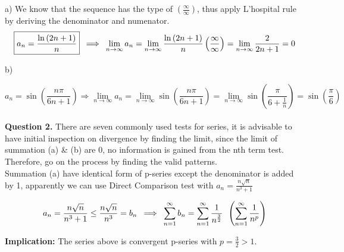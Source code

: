 \documentclass[a4paper]{exam}
\begin{document}
	\noindent a) We know that the sequence has the type of $\left(\frac{\infty}{\infty}\right)$, thus apply L'hospital rule by deriving the denominator and numenator. \\
	
	\begin{equation*}
		\boxed{a_{n} = \frac{\ln{\left(2n + 1\right)}}{n}} \hspace{0.5em} \Longrightarrow \hspace{0.5em} \lim_{n \to \infty} a_{n} = \lim_{n \to \infty} \frac{\ln{\left(2n + 1\right)}}{n} \left(\frac{\infty}{\infty}\right) = \lim_{n \to \infty} \frac{2}{2n + 1} = 0
	\end{equation*}
	
	\noindent b) 
	
	\begin{equation*}
		\boxed{a_{n} = \sin{\left(\frac{n\pi}{6n + 1}\right)}} \Longrightarrow \lim_{n \to \infty} a_{n} = \lim_{n \to \infty} \sin{\left(\frac{n\pi}{6n + 1}\right)} = \lim_{n \to \infty} \sin{\left(\frac{\pi}{6 + \frac{1}{n}}\right)} = \sin{\left(\frac{\pi}{6}\right)}
	\end{equation*}\\[0.5ex]
	
	\noindent \textbf{Question 2.} There are seven commonly used tests for series, it is advisable to have initial inspection on divergence by finding the limit, since the limit of summation (a) \& (b) are 0, no information is gained from the nth term test. Therefore, go on the process by finding the valid patterns. \\[0.5ex]
	
	\noindent Summation (a) have identical form of p-series except the denominator is added by 1, apparently we can use Direct Comparison test with $a_{n} = \frac{n\sqrt{n}}{n^{3} + 1}$ 
	
	\begin{equation*}
		a_{n} = \frac{n\sqrt{n}}{n^{3} + 1} \le \frac{n\sqrt{n}}{n^{3}} = b_{n} \hspace{0.5em} \Longrightarrow \hspace{0.5em} \sum_{n = 1}^{\infty} b_{n} = \sum_{n = 1}^{\infty} \frac{1}{n^{\frac{3}{2}}} \hspace{0.5em} \left(\sum_{n = 1}^{\infty} \frac{1}{n^{p}}\right) 
	\end{equation*}
	
	\vspace*{1mm}
	
	\noindent \textbf{Implication:} The series above is convergent p-series with $p = \frac{3}{2} > 1$.\\[0.5ex]
	
\end{document}

